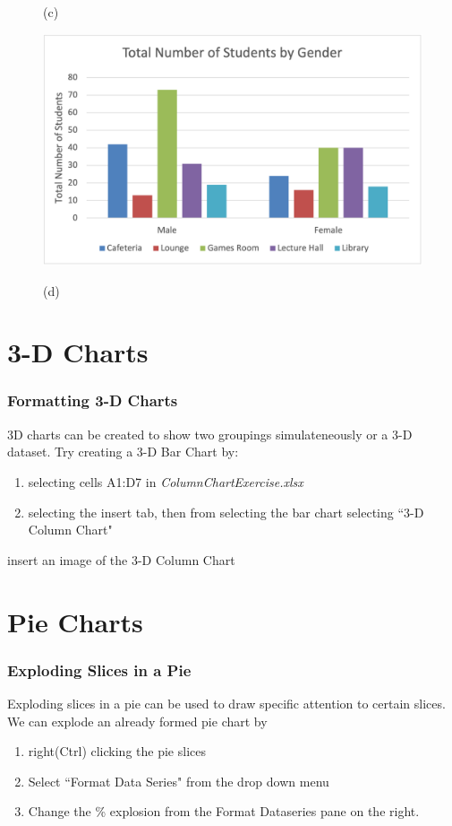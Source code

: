\documentclass[12pt]{beamer}
\begin{document}
\begin{frame}
\begin{figure}[htb]
\begin{minipage}[t]{0.45\linewidth}
			\medskip
			\centerline{(c)}
		\end{minipage}
		\begin{minipage}[t]{0.45\linewidth}\centering
		\includegraphics[width=0.9\linewidth]{Exercise1ByGender.png}
		\medskip
		\centerline{(d)}
	\end{minipage}
	\end{figure}
\end{frame}
\section{3-D Charts}
	\begin{frame}
		\frametitle{Formatting 3-D Charts}
		3D charts can be created to show two groupings simulateneously or a 3-D dataset. 
		Try creating a 3-D  Bar Chart by:
		\begin{enumerate}
			\item selecting cells A1:D7 in \textit{ColumnChartExercise.xlsx}
			\item selecting the insert tab, then from selecting the bar chart selecting ``3-D Column Chart"
		\end{enumerate}
		insert an image of the 3-D Column Chart 
	\end{frame}
\section{Pie Charts}
\begin{frame}
	\frametitle{Exploding Slices in a Pie}
	Exploding slices in a pie can be used to draw specific attention to certain slices. We can explode an already formed pie chart by 
	\begin{enumerate}
		\item right(Ctrl) clicking the pie slices
		\item Select ``Format Data Series" from the drop down menu
		\item Change the \% explosion from the Format Dataseries pane on the right.
	\end{enumerate}
\end{frame}
\end{document}
